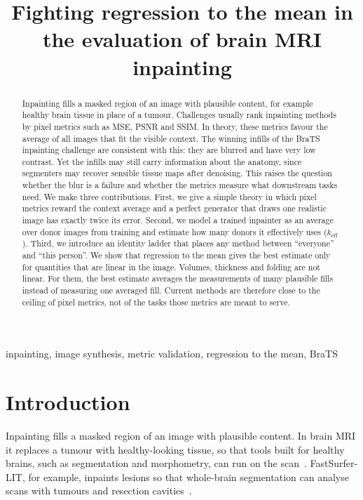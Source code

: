 \documentclass{article}
\title{Fighting regression to the mean in the evaluation of brain MRI inpainting}
\begin{document}
\maketitle

\begin{abstract}
Inpainting fills a masked region of an image with plausible content, for example healthy brain tissue in place of a tumour.
Challenges usually rank inpainting methods by pixel metrics such as MSE, PSNR and SSIM.
In theory, these metrics favour the average of all images that fit the visible context.
The winning infills of the BraTS inpainting challenge are consistent with this: they are blurred and have very low contrast.
Yet the infills may still carry information about the anatomy, since segmenters may recover sensible tissue maps after denoising.
This raises the question whether the blur is a failure and whether the metrics measure what downstream tasks need.
We make three contributions.
First, we give a simple theory in which pixel metrics reward the context average and a perfect generator that draws one realistic image has exactly twice its error.
Second, we model a trained inpainter as an average over donor images from training and estimate how many donors it effectively uses ($k_{\mathrm{eff}}$).
Third, we introduce an identity ladder that places any method between ``everyone'' and ``this person''.
We show that regression to the mean gives the best estimate only for quantities that are linear in the image.
Volumes, thickness and folding are not linear.
For them, the best estimate averages the measurements of many plausible fills instead of measuring one averaged fill.
Current methods are therefore close to the ceiling of pixel metrics, not of the tasks those metrics are meant to serve.
\end{abstract}
\begin{keywords}
inpainting, image synthesis, metric validation, regression to the mean, BraTS
\end{keywords}

\section{Introduction}
\label{sec:intro}
Inpainting fills a masked region of an image with plausible content.
In brain MRI it replaces a tumour with healthy-looking tissue, so that tools built for healthy brains, such as segmentation and morphometry, can run on the scan~\cite{kofler2023brats}.
FastSurfer-LIT, for example, inpaints lesions so that whole-brain segmentation can analyse scans with tumours and resection cavities~\cite{pollak2025}.
\end{document}
